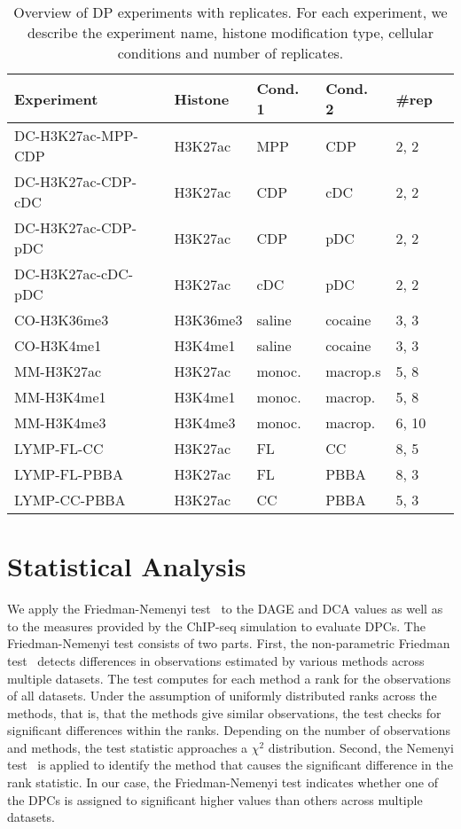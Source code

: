 \begin{table}[th]\centering
\begin{tabular}{llllll}
 Experiment & Histone & Cond. 1 & Cond. 2 & \#rep \\ \hline
 DC-H3K27ac-MPP-CDP & H3K27ac & MPP & CDP & 2, 2 \\
 DC-H3K27ac-CDP-cDC & H3K27ac & CDP & cDC & 2, 2 \\
 DC-H3K27ac-CDP-pDC & H3K27ac & CDP & pDC & 2, 2 \\
 DC-H3K27ac-cDC-pDC & H3K27ac & cDC & pDC & 2, 2 \\
 CO-H3K36me3 & H3K36me3 & saline & cocaine & 3, 3 \\
 CO-H3K4me1 & H3K4me1 & saline & cocaine & 3, 3 \\
 MM-H3K27ac & H3K27ac & monoc. & macrop.s & 5, 8 \\
 MM-H3K4me1 & H3K4me1 & monoc. & macrop. & 5, 8 \\
 MM-H3K4me3 & H3K4me3 & monoc. & macrop. & 6, 10 \\
 LYMP-FL-CC & H3K27ac & FL & CC & 8, 5 \\
 LYMP-FL-PBBA & H3K27ac & FL & PBBA & 8, 3 \\
 LYMP-CC-PBBA & H3K27ac & CC & PBBA & 5, 3 \\
 \end{tabular}
\caption[DP experiments with replicates]{Overview of DP experiments with replicates. 
For each experiment, we describe the experiment name, histone modification type, cellular conditions and number of replicates.
}
\label{table_datasets_with_replicates}
\end{table}

\section{Statistical Analysis}
\label{sec_friedman_test}
We apply the Friedman-Nemenyi test~\citep{demsar2006} to the DAGE and DCA values as well as to the measures provided by the ChIP-seq simulation to evaluate DPCs.
The Friedman-Nemenyi test consists of two parts.
First, the non-parametric Friedman test~\citep{Friedman1937} detects differences in observations estimated by various methods across multiple datasets.
The test computes for each method a rank for the observations of all datasets.
Under the assumption of uniformly distributed ranks across the methods, that is, that the methods give similar observations, the test checks for significant differences within the ranks.
Depending on the number of observations and methods, the test statistic approaches a $\chi^2$ distribution.
Second, the Nemenyi test~\citep{Nemenyi1963} is applied to identify the method that causes the significant difference in the rank statistic.
In our case, the Friedman-Nemenyi test indicates whether one of the DPCs is assigned to significant higher values than others across multiple datasets. 

